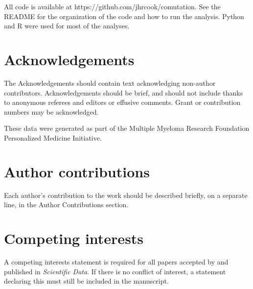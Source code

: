 \documentclass[english, 10pt, letterpaper]{article}
\begin{document}
All code is available at https://github.com/jhrcook/comutation.
See the README for the organization of the code and how to run the analysis.
Python \cite{van1995python} and R \cite{Rlang} were used for most of the analyses.



\section*{Acknowledgements}

The Acknowledgements should contain text acknowledging non-author contributors.
Acknowledgements should be brief, and should not include thanks to anonymous referees and editors or effusive comments.
Grant or contribution numbers may be acknowledged.

These data were generated as part of the Multiple Myeloma Research Foundation Personalized Medicine Initiative.

\section*{Author contributions}

Each author’s contribution to the work should be described briefly, on a separate line, in the Author Contributions section. 

\section*{Competing interests}

A competing interests statement is required for all papers accepted by and published in \emph{Scientific Data}. If there is no conflict of interest, a statement declaring this must still be included in the manuscript.



{}
\end{document}
